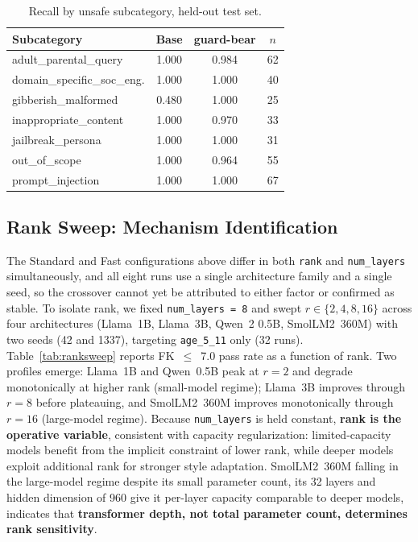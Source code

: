 \documentclass[pdflatex,sn-mathphys-num]{sn-jnl}%
\begin{document}
\begin{table}[!h]
  \centering
  \caption{Recall by unsafe subcategory, held-out test set.}
  \label{tab:guardsubcat}
  \small
  \begin{tabular}{@{}lccc@{}}
    \toprule
    Subcategory & Base & guard-bear & $n$ \\
    \midrule
    adult\_parental\_query      & 1.000 & 0.984 & 62 \\
    domain\_specific\_soc\_eng. & 1.000 & 1.000 & 40 \\
    gibberish\_malformed        & 0.480 & 1.000 & 25 \\
    inappropriate\_content      & 1.000 & 0.970 & 33 \\
    jailbreak\_persona          & 1.000 & 1.000 & 31 \\
    out\_of\_scope              & 1.000 & 0.964 & 55 \\
    prompt\_injection           & 1.000 & 1.000 & 67 \\
    \bottomrule
  \end{tabular}
\end{table}

\subsection{Rank Sweep: Mechanism Identification}\label{sec:ranksweep}

The Standard and Fast configurations above differ in both \texttt{rank} and \texttt{num\_layers} simultaneously, and all eight runs use a single architecture family and a single seed, so the crossover cannot yet be attributed to either factor or confirmed as stable. To isolate rank, we fixed \texttt{num\_layers~=~8} and swept $r \in \{2, 4, 8, 16\}$ across four architectures (Llama~1B, Llama~3B, Qwen~2 0.5B, SmolLM2~360M) with two seeds (42 and 1337), targeting \texttt{age\_5\_11} only (32 runs). Table~\ref{tab:ranksweep} reports FK~$\leq$~7.0 pass rate as a function of rank. Two profiles emerge: Llama~1B and Qwen~0.5B peak at $r=2$ and degrade monotonically at higher rank (small-model regime); Llama~3B improves through $r=8$ before plateauing, and SmolLM2~360M improves monotonically through $r=16$ (large-model regime). Because \texttt{num\_layers} is held constant, \textbf{rank is the operative variable}, consistent with capacity regularization: limited-capacity models benefit from the implicit constraint of lower rank, while deeper models exploit additional rank for stronger style adaptation. SmolLM2~360M falling in the large-model regime despite its small parameter count, its 32 layers and hidden dimension of 960 give it per-layer capacity comparable to deeper models, indicates that \textbf{transformer depth, not total parameter count, determines rank sensitivity}.
\end{document}
